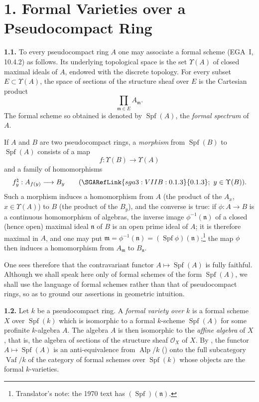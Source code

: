 
\section*{1. Formal Varieties over a Pseudocompact Ring}
\label{sga3:VIIB:1}

\medskip
\noindent\textbf{1.1.}
\label{sga3:VIIB:1.1}
To every pseudocompact ring \(A\) one may associate a formal scheme
(EGA~I, 10.4.2) as follows. Its underlying topological space is the
set \(\Upsilon(A)\) of closed maximal ideals of \(A\), endowed with the
discrete topology. For every subset
\(E\subset\Upsilon(A)\), the space of sections of the structure sheaf
over \(E\) is the Cartesian product
\[
  \prod_{\mathfrak m\in E}A_{\mathfrak m}.
\]
The formal scheme so obtained is denoted by \(\operatorname{Spf}(A)\),
the \emph{formal spectrum} of \(A\).

If \(A\) and \(B\) are two pseudocompact rings, a \emph{morphism} from
\(\operatorname{Spf}(B)\) to \(\operatorname{Spf}(A)\) consists of a
map
\[
  f:\Upsilon(B)\longrightarrow\Upsilon(A)
\]
and a family of homomorphisms
\[
  f_y^\natural:A_{f(y)}\longrightarrow B_y
  \qquad(\SGARefLink{sga3:VIIB:0.1.3}{0.1.3};\ y\in\Upsilon(B)).
\]
Such a morphism induces a homomorphism from \(A\) (the product of the
\(A_x\), \(x\in\Upsilon(A)\)) to \(B\) (the product of the \(B_y\)), and
the converse is true: if \(\phi:A\to B\) is a continuous homomorphism of
algebras, the inverse image \(\phi^{-1}(\mathfrak n)\) of a closed (hence
open) maximal ideal \(\mathfrak n\) of \(B\) is an open prime ideal of
\(A\); it is therefore maximal in \(A\), and one may put
\(\mathfrak m=\phi^{-1}(\mathfrak n)=(\operatorname{Spf}\phi)(\mathfrak n)\);\footnote{Translator's note:
the 1970 text has \((\operatorname{Spf})(\mathfrak n)\).} the map \(\phi\)
then induces a homomorphism from \(A_{\mathfrak m}\) to
\(B_{\mathfrak n}\).

One sees therefore that the contravariant functor
\(A\mapsto\operatorname{Spf}(A)\) is fully faithful. Although we shall
speak here only of formal schemes of the form \(\operatorname{Spf}(A)\),
we shall use the language of formal schemes rather than that of
pseudocompact rings, so as to ground our assertions in geometric
intuition.

\medskip
\noindent\textbf{1.2.}
\label{sga3:VIIB:1.2}
Let \(k\) be a pseudocompact ring. A \emph{formal variety over
\(k\)} is a formal scheme \(X\) over \(\operatorname{Spf}(k)\) which is
isomorphic to a formal \(k\)-scheme \(\operatorname{Spf}(A)\) for some
profinite \(k\)-algebra \(A\). The algebra \(A\) is then isomorphic to
the \emph{affine algebra} of \(X\), that is, the algebra of sections of
the structure sheaf \(\mathcal O_X\) of \(X\). By , the functor
\(A\mapsto\operatorname{Spf}(A)\) is an anti-equivalence from
\(\operatorname{Alp}/k\) () onto the full subcategory
\(\operatorname{Vaf}/k\) of the category of formal schemes over
\(\operatorname{Spf}(k)\) whose objects are the formal \(k\)-varieties.

